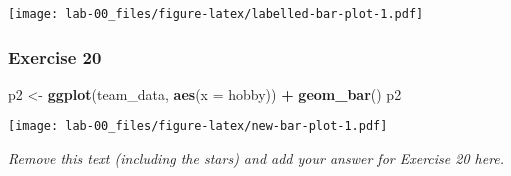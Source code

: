\documentclass[
]{article}
\newenvironment{Shaded}{\begin{snugshade}}{\end{snugshade}}
\newcommand{\AttributeTok}[1]{\textcolor[rgb]{0.13,0.29,0.53}{#1}}
\newcommand{\FunctionTok}[1]{\textcolor[rgb]{0.13,0.29,0.53}{\textbf{#1}}}
\newcommand{\NormalTok}[1]{#1}
\newcommand{\OtherTok}[1]{\textcolor[rgb]{0.56,0.35,0.01}{#1}}
\newcommand{\SpecialCharTok}[1]{\textcolor[rgb]{0.81,0.36,0.00}{\textbf{#1}}}
\begin{document}
\texttt{[image: lab-00\_files/figure-latex/labelled-bar-plot-1.pdf]}

\hypertarget{exercise-20}{%
\subsubsection{Exercise 20}\label{exercise-20}}

\begin{Shaded}
\begin{Highlighting}[]
\NormalTok{p2 }\OtherTok{\textless{}{-}} \FunctionTok{ggplot}\NormalTok{(team\_data, }\FunctionTok{aes}\NormalTok{(}\AttributeTok{x =}\NormalTok{ hobby)) }\SpecialCharTok{+}
  \FunctionTok{geom\_bar}\NormalTok{()}
\NormalTok{p2}
\end{Highlighting}
\end{Shaded}

\texttt{[image: lab-00\_files/figure-latex/new-bar-plot-1.pdf]}

\emph{Remove this text (including the stars) and add your answer for
Exercise 20 here.}
\end{document}
